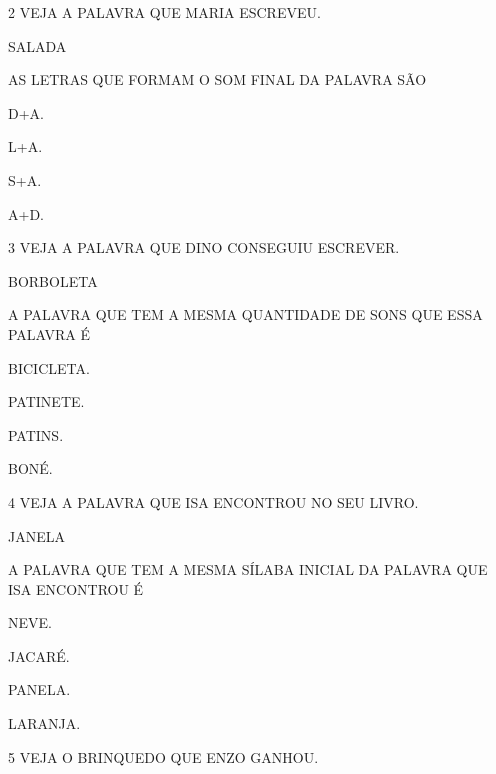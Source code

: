 \num{2} VEJA A PALAVRA QUE MARIA ESCREVEU.

\begin{myquote}
SALADA
\end{myquote}

AS LETRAS QUE FORMAM O SOM FINAL DA PALAVRA SÃO

\begin{escolha}
\item D+A.

\item L+A.

\item S+A.

\item A+D.
\end{escolha}

\pagebreak
\num{3} VEJA A PALAVRA QUE DINO CONSEGUIU ESCREVER.

\begin{myquote}
BORBOLETA
\end{myquote}

A PALAVRA QUE TEM A MESMA QUANTIDADE DE SONS QUE ESSA PALAVRA É 

\begin{escolha}
\item BICICLETA.

\item PATINETE.

\item PATINS.

\item BONÉ.
\end{escolha}

\num{4} VEJA A PALAVRA QUE ISA ENCONTROU NO SEU LIVRO. 

\begin{myquote}
JANELA
\end{myquote}

A PALAVRA QUE TEM A MESMA SÍLABA INICIAL DA PALAVRA QUE ISA ENCONTROU É

\begin{escolha}
\item NEVE.

\item JACARÉ.

\item PANELA.

\item LARANJA.
\end{escolha}

\pagebreak
\num{5} VEJA O BRINQUEDO QUE ENZO GANHOU.

